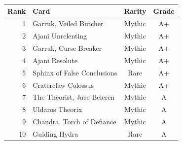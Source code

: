 \begin{tabular}{rlcc}
\toprule
Rank & Card & Rarity & Grade \\
\midrule
1 & Garruk, Veiled Butcher & Mythic & A+ \\
2 & Ajani Unrelenting & Mythic & A+ \\
3 & Garruk, Curse Breaker & Mythic & A+ \\
4 & Ajani Resolute & Mythic & A+ \\
5 & Sphinx of False Conclusions & Rare & A+ \\
6 & Craterclaw Colossus & Mythic & A+ \\
7 & The Theorist, Jace Beleren & Mythic & A \\
8 & Uldaros Theorix & Mythic & A \\
9 & Chandra, Torch of Defiance & Mythic & A \\
10 & Guiding Hydra & Rare & A \\
\bottomrule
\end{tabular}
